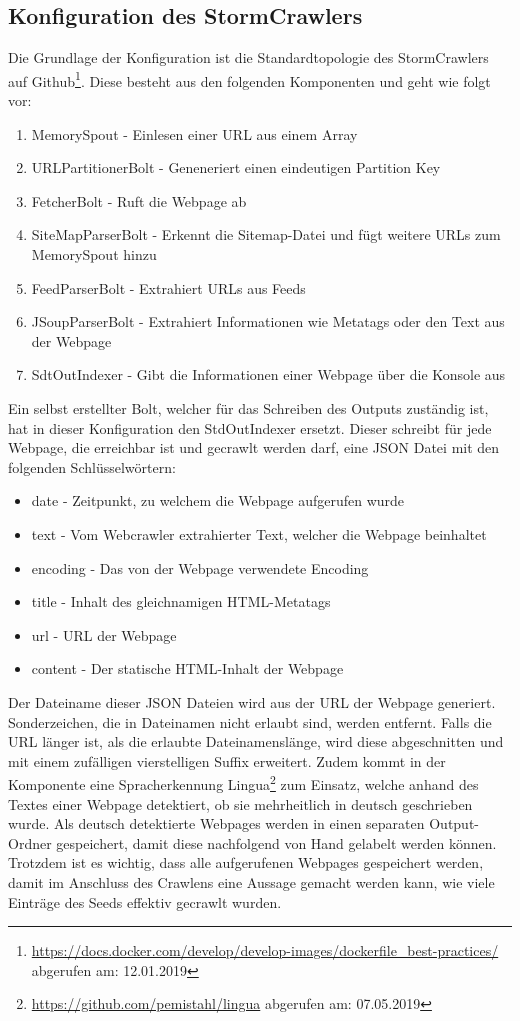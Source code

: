 \subsection{Konfiguration des StormCrawlers}
Die Grundlage der Konfiguration ist die Standardtopologie des StormCrawlers auf Github\footnote{\url{https://docs.docker.com/develop/develop-images/dockerfile_best-practices/} abgerufen am: 12.01.2019}.
Diese besteht aus den folgenden Komponenten und geht wie folgt vor:
\begin{enumerate}
	\item MemorySpout - Einlesen einer URL aus einem Array
	\item URLPartitionerBolt - Geneneriert einen eindeutigen Partition Key
	\item FetcherBolt - Ruft die Webpage ab
	\item SiteMapParserBolt - Erkennt die Sitemap-Datei und fügt weitere URLs zum MemorySpout hinzu
	\item FeedParserBolt - Extrahiert URLs aus Feeds
	\item JSoupParserBolt - Extrahiert Informationen wie Metatags oder den Text aus der Webpage
	\item SdtOutIndexer - Gibt die Informationen einer Webpage über die Konsole aus
\end{enumerate}
Ein selbst erstellter Bolt, welcher für das Schreiben des Outputs zuständig ist, hat in dieser Konfiguration den StdOutIndexer ersetzt.
Dieser schreibt für jede Webpage, die erreichbar ist und gecrawlt werden darf, eine JSON Datei mit den folgenden Schlüsselwörtern:
\begin{itemize}
	\item \glqq date\grqq{} - Zeitpunkt, zu welchem die Webpage aufgerufen wurde
	\item \glqq text\grqq{} - Vom Webcrawler extrahierter Text, welcher die Webpage beinhaltet
	\item \glqq encoding\grqq{} - Das von der Webpage verwendete Encoding
	\item \glqq title\grqq{} - Inhalt des gleichnamigen HTML-Metatags
	\item \glqq url\grqq{} - URL der Webpage
	\item \glqq content\grqq{} - Der statische HTML-Inhalt der Webpage	
\end{itemize}
Der Dateiname dieser JSON Dateien wird aus der URL der Webpage generiert. 
Sonderzeichen, die in Dateinamen nicht erlaubt sind, werden entfernt. Falls die URL länger ist, als die erlaubte Dateinamenslänge, wird diese abgeschnitten und mit einem zufälligen vierstelligen Suffix erweitert.
Zudem kommt in der Komponente eine Spracherkennung \glqq Lingua\footnote{\url{https://github.com/pemistahl/lingua} abgerufen am: 07.05.2019}\grqq{} zum Einsatz, welche anhand des Textes einer Webpage detektiert, ob sie mehrheitlich in deutsch geschrieben wurde.
Als deutsch detektierte Webpages werden in einen separaten Output-Ordner gespeichert, damit diese nachfolgend von Hand gelabelt werden können.
Trotzdem ist es wichtig, dass alle aufgerufenen Webpages gespeichert werden, damit im Anschluss des Crawlens eine Aussage gemacht werden kann, wie viele Einträge des Seeds effektiv gecrawlt wurden.
